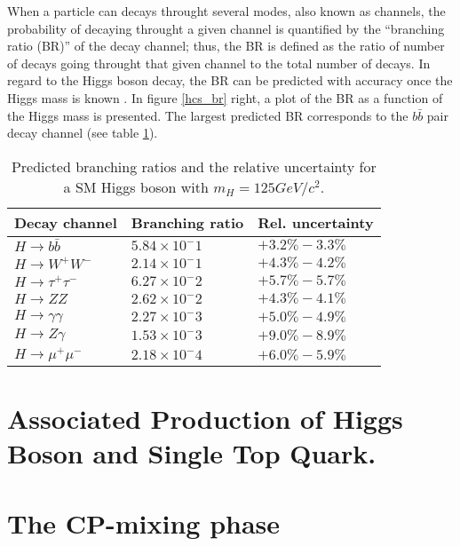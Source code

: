 \noindent When a particle can decays throught several modes, also known as channels, the probability of decaying throught a given channel is quantified by the ``branching ratio (BR)'' of the decay channel; thus, the BR is defined as the ratio of number of decays going throught that given channel to the total number of decays. In regard to the Higgs boson decay, the BR can be predicted with accuracy once the Higgs mass is known \cite{riley, denner}. In figure \ref{hcs_br} right, a plot of the BR as a function of the Higgs mass is presented. The largest predicted BR corresponds to the $b\bar{b}$ pair decay channel (see table \ref{hdbr}). %

\begin{center}
\begin{table}[h]
\centering
\begin{tabular}{lll}\hline
Decay channel       & Branching ratio   & Rel. uncertainty\\\hline
$H\to b\bar{b}$     & $5.84\times10^-1$ & $+3.2\%-3.3\%$\\
$H\to W^+W^-$       & $2.14\times10^-1$ & $+4.3\%-4.2\%$\\
$H\to\tau^+\tau^-$  & $6.27\times10^-2$ & $+5.7\%-5.7\%$\\
$H\to ZZ$           & $2.62\times10^-2$ & $+4.3\%-4.1\%$\\
$H\to \gamma\gamma$ & $2.27\times10^-3$ & $+5.0\%-4.9\%$\\
$H\to Z\gamma$      & $1.53\times10^-3$ & $+9.0\%-8.9\%$\\
$H\to\mu^+\mu^-$    & $2.18\times10^-4$ & $+6.0\%-5.9\%$\\\hline
\end{tabular}
\caption[Predicted branching ratios for a SM Higgs boson with $m_H = 125$ GeV/c$^2$.]{Predicted branching ratios and the relative uncertainty for a SM Higgs boson with $m_H = 125GeV/c^2$.\cite{pdg}}\label{hdbr}
\end{table}
\end{center}
\section{Associated Production of Higgs Boson and Single Top Quark.}\label{sec:thq}

\noindent 

\section{The CP-mixing phase}
\label{secc:cp}

